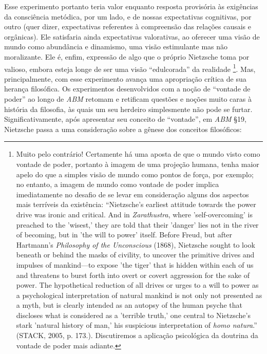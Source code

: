 \documentclass[
	12pt,				%
	openright,			%
	oneside,			%
	a4paper,			%
	english,			%
	french,				%
	spanish,			%
	brazil				%
	]{abntex2}
\begin{document}
Esse experimento portanto teria valor enquanto resposta provisória às exigências da consciência metódica, por um lado, e de nossas expectativas cognitivas, por outro (quer dizer, expectativas referentes à compreensão das relações causais e orgânicas). Ele satisfaria ainda expectativas valorativas, ao oferecer uma visão de mundo como abundância e dinamismo, uma visão estimulante mas não moralizante. Ele é, enfim, expressão de algo que o próprio Nietzsche toma por valioso, embora esteja longe de ser uma visão “edulcorada” da realidade
\footnote{Muito pelo contrário! Certamente há uma aposta de que o mundo visto como vontade de poder, portanto  à imagem de uma projeção humana, tenha maior apelo do que a simples visão de mundo como pontos de força, por exemplo; no entanto, a imagem de mundo como vontade de poder implica imediatamente no desafio de se levar em consideração alguns dos aspectos mais terríveis da existência: “Nietzsche’s earliest attitude towards the power drive was ironic and critical. And in \textit{Zarathustra}, where 'self-overcoming' is preached to the 'wisest,' they are told that their 'danger' lies not in the river of becoming, but in 'the will to power' itself. Before Freud, but after Hartmann’s \textit{Philosophy of the Unconscious} (1868), Nietzsche sought to look beneath or behind the masks of civility, to uncover the primitive drives and impulses of mankind—to expose 'the tiger' that is hidden within each of us and threatens to burst forth into overt or covert aggression for the sake of power. The hypothetical reduction of all drives or urges to a will to power as a psychological interpretation of natural mankind is not only not presented as a myth, but is clearly intended as an autopsy of the human psyche that discloses what is considered as a 'terrible truth,' one central to Nietzsche’s stark 'natural history of man,' his suspicious interpretation of \textit{homo natura}.” (STACK, 2005, p. 173.). Discutiremos a aplicação psicológica da doutrina da vontade de poder mais adiante.}. 
Mas, principalmente, com esse experimento avança uma apropriação crítica de sua herança filosófica. Os experimentos desenvolvidos com a noção de “vontade de poder” ao longo de \textit{ABM} retomam e retificam questões e noções muito caras à história da filosofia, às quais um seu herdeiro simplesmente não pode se furtar. Significativamente, após apresentar seu conceito de “vontade”, em \textit{ABM} §19, Nietzsche passa a uma consideração sobre a gênese dos conceitos filosóficos:
\end{document}
